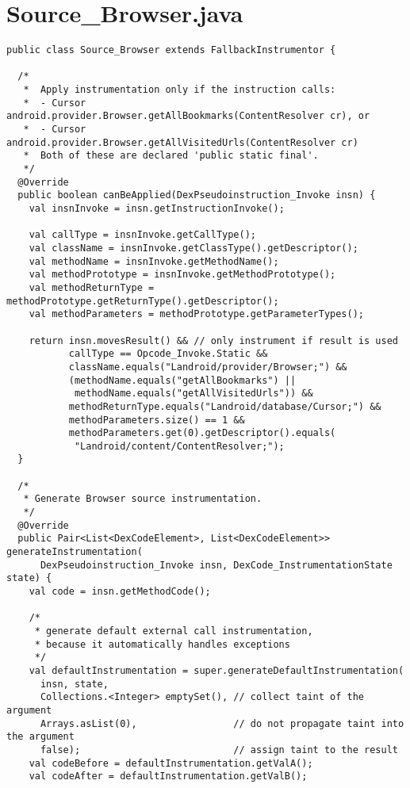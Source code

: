 \section{Source\_Browser.java}

\begin{lstlisting}
public class Source_Browser extends FallbackInstrumentor {

  /*
   *  Apply instrumentation only if the instruction calls:
   *  - Cursor android.provider.Browser.getAllBookmarks(ContentResolver cr), or
   *  - Cursor android.provider.Browser.getAllVisitedUrls(ContentResolver cr)
   *  Both of these are declared 'public static final'.
   */
  @Override
  public boolean canBeApplied(DexPseudoinstruction_Invoke insn) {
    val insnInvoke = insn.getInstructionInvoke();

    val callType = insnInvoke.getCallType();
    val className = insnInvoke.getClassType().getDescriptor();
    val methodName = insnInvoke.getMethodName();
    val methodPrototype = insnInvoke.getMethodPrototype();
    val methodReturnType = methodPrototype.getReturnType().getDescriptor();
    val methodParameters = methodPrototype.getParameterTypes();

    return insn.movesResult() && // only instrument if result is used
           callType == Opcode_Invoke.Static &&
           className.equals("Landroid/provider/Browser;") &&
           (methodName.equals("getAllBookmarks") || 
           	methodName.equals("getAllVisitedUrls")) &&
           methodReturnType.equals("Landroid/database/Cursor;") &&
           methodParameters.size() == 1 &&
           methodParameters.get(0).getDescriptor().equals(
           	"Landroid/content/ContentResolver;");
  }

  /*
   * Generate Browser source instrumentation.
   */
  @Override
  public Pair<List<DexCodeElement>, List<DexCodeElement>> generateInstrumentation(
      DexPseudoinstruction_Invoke insn, DexCode_InstrumentationState state) {
    val code = insn.getMethodCode();

    /*
     * generate default external call instrumentation,
     * because it automatically handles exceptions
     */
    val defaultInstrumentation = super.generateDefaultInstrumentation(
      insn, state,
      Collections.<Integer> emptySet(), // collect taint of the argument
      Arrays.asList(0),                 // do not propagate taint into the argument
      false);                           // assign taint to the result
    val codeBefore = defaultInstrumentation.getValA();
    val codeAfter = defaultInstrumentation.getValB();


\end{lstlisting}
